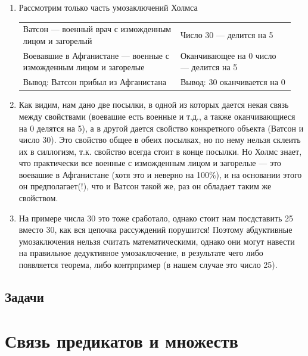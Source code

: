 \begin{enumerate}
\item Рассмотрим только часть умозаключений Холмса\hfill\;

\begin{tabular}{p{0.55\linewidth}p{0.4\linewidth}}\hline
Ватсон --- военный врач с изможденным лицом и загорелый & 
Число 30 --- делится на 5 \\
Воевавшие в Афганистане --- военные с изможденным лицом и загорелые &
Оканчивающее на 0 число --- делится на 5 \\\hline

Вывод: Ватсон прибыл из Афганистана & Вывод: 30 оканчивается на 0\\\hline
\end{tabular}

\item Как видим, нам дано две посылки, в одной из которых дается некая связь между свойствами (воевашие есть военные и т.д., а также оканчивающиеся на 0 делятся на 5), а в другой дается свойство конкретного объекта (Ватсон и число 30). Это свойство общее в обеих посылках, но по нему нельзя склеить их в силлогизм, т.к. свойство всегда стоит в конце посылки. Но Холмс знает, что практически все военные с изможденным лицом и загорелые --- это воевашие в Афганистане (хотя это и неверно на 100\%), и на основании этого он предполагает(!), что и Ватсон такой же, раз он обладает таким же свойством.

\item На примере числа 30 это тоже сработало, однако стоит нам посдставить 25 вместо 30, как вся цепочка рассуждений порушится! Поэтому абдуктивные умозаключения нельзя считать математическими, однако они могут навести на правильное дедуктивное умозаключение, в результате чего либо появляется теорема, либо контрпример (в нашем случае это число 25).
\end{enumerate}

\subsection{Задачи}



\section{Связь предикатов и множеств}

